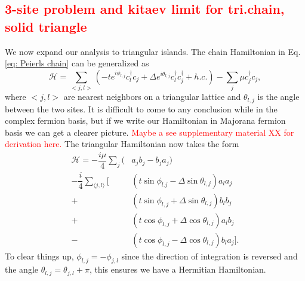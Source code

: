 \documentclass[aps,prb,showpacs,amsmath,amssymb,superscriptaddress]{revtex4-2}
\newcommand{\Red}[1]{\textcolor{red}{#1}}
\newcommand{\Ham}{\mathcal{H}}
\newcommand{\cc}{c^{\dagger}}
\newcommand{\de}{\Delta}
\begin{document}
\subsection{\Red{3-site problem and kitaev limit for tri.chain, solid triangle}}
We now expand our analysis to triangular islands.
The chain Hamiltonian in Eq. \ref{eq: Peierls chain} can be generalized as
\begin{equation} \label{eq: Peierls triangle}
  \Ham = \sum_{<j,l>} (-t e^{i\phi_{l,j}} \cc_{l} c_j + \de e^{i\theta_{l,j}} \cc_{l}\cc_j + h.c.) - \sum_j \mu \cc_j c_j,
\end{equation}
where $<j,l>$ are nearest neighbors on a triangular lattice and $\theta_{l,j}$ is the angle between the two sites.
It is difficult to come to any conclusion while in the complex fermion basis, but if we write our Hamiltonian in Majorana fermion basis we can get a clearer picture.
\Red{Maybe a see supplementary material XX for derivation here.}
The triangular Hamiltonian now takes the form
\begin{align}
  \Ham = -\dfrac{i\mu}{4} \sum_j (& a_j b_j - b_j a_j) \nonumber \\
  -\dfrac{i}{4} \sum_{\langle j,l \rangle} [&(t\sin\phi_{l.j}-\de\sin\theta_{l,j}) a_l a_j \nonumber \\
  +&(t\sin\phi_{l,j}+\de\sin\theta_{l,j}) b_l b_j \nonumber \\
  +&(t\cos\phi_{l,j}+\de\cos\theta_{l,j}) a_l b_j \nonumber \\
  -&(t\cos\phi_{l,j}-\de\cos\theta_{l,j}) b_l a_j].
\end{align}
To clear things up, $\phi_{l,j} = -\phi_{j,l}$ since the direction of integration is reversed and the angle $\theta_{l,j} = \theta_{j,l} + \pi$, this ensures we have a Hermitian Hamiltonian.
\end{document}
